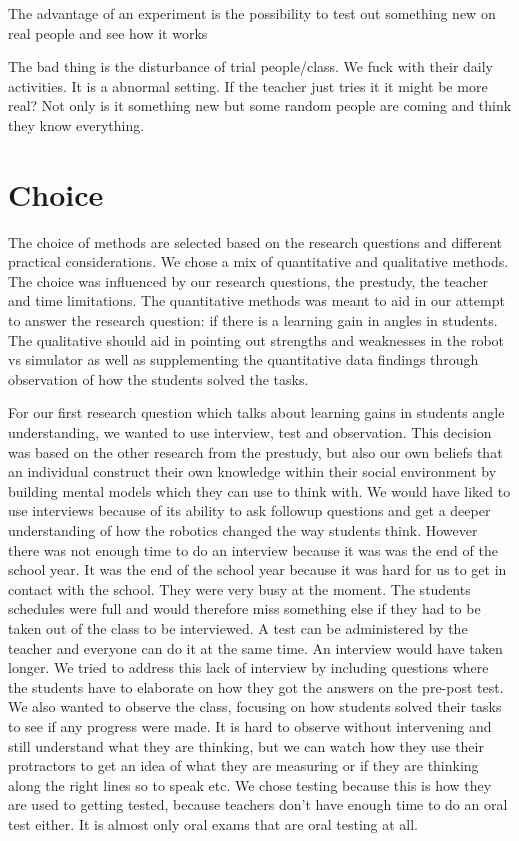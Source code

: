 \bigskip\noindent
The advantage of an experiment is the possibility  to test out something new on real people and see how it works

\bigskip\noindent
The bad thing is the disturbance of trial people/class. We fuck with their daily activities. It is a abnormal setting. If the teacher just tries it it might be more real? Not only is it something new but some random people are coming and think they know everything. 
\section{Choice}
The choice of methods are selected based on the research questions and different practical considerations. We chose a mix of quantitative and qualitative methods. The choice was influenced by our research questions, the prestudy, the teacher and time limitations. The quantitative methods was meant to aid in our attempt to answer the research question: if there is a learning gain in angles in students. The qualitative should aid in pointing out strengths and weaknesses in the robot vs simulator as well as supplementing the quantitative data findings through observation of how the students solved the tasks. 

\bigskip\noindent
For our first research question which talks about learning gains in students angle understanding, we wanted to use interview, test and observation. This decision was based on the other research from the prestudy, but also our own beliefs that an individual construct their own knowledge within their social environment by building mental models which they can use to think with. We would have liked to use interviews because of its ability to ask followup questions and get a deeper understanding of how the robotics changed the way students think. However there was not enough time to do an interview because it was was the end of the school year. It was the end of the school year because it was hard for us to get in contact with the school. They were very busy at the moment. The students schedules were full and would therefore miss something else if they had to be taken out of the class to be interviewed. A test can be administered by the teacher and everyone can do it at the same time. An interview would have taken longer. We tried to address this lack of interview by including questions where the students have to elaborate on how they got the answers on the pre-post test. We also wanted to observe the class, focusing on how students solved their tasks to see if any progress were made. It is hard to observe without intervening and still understand what they are thinking, but we can watch how they use their protractors to get an idea of what they are measuring or if they are thinking along the right lines so to speak etc. We chose testing because this is how they are used to getting tested, because teachers don’t have enough time to do an oral test either. It is almost only oral exams that are oral testing at all. 


